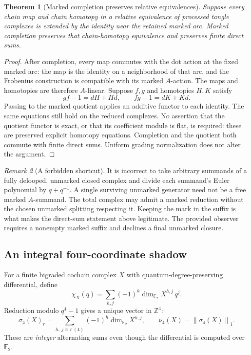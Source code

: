 \documentclass[11pt]{article}
\newtheorem{theorem}{Theorem}[section]
\theoremstyle{definition}
\theoremstyle{remark}
\newtheorem{remark}[theorem]{Remark}
\newcommand{\F}{{\mathbb F_2}}
\newcommand{\Z}{\mathbb Z}
\newcommand{\sig}{\sigma_4}
\newcommand{\nuFour}{\nu_4}
\newcommand{\norm}[1]{\left\lVert#1\right\rVert_1}
\begin{document}
\begin{theorem}[Marked completion preserves relative equivalences]
\label{thm:mark}
Suppose every chain map and chain homotopy in a relative equivalence of
processed tangle complexes is extended by the identity near the retained
marked arc. Marked completion preserves that chain-homotopy equivalence and
preserves finite direct sums.
\end{theorem}
\begin{proof}
After completion, every map commutes with the dot action at the fixed marked
arc: the map is the identity on a neighborhood of that arc, and the
Frobenius construction is compatible with its marked $A$-action. The maps
and homotopies are therefore $A$-linear. Suppose $f,g$ and homotopies $H,K$
satisfy
\[
 gf-1=dH+Hd,\qquad fg-1=dK+Kd.
\]
Passing to the marked quotient applies an additive functor to each identity.
The same equations still hold on the reduced complexes. No assertion that
the quotient functor is exact, or that its coefficient module is flat, is
required: these are preserved explicit homotopy equations. Completion and
the quotient both commute with finite direct sums. Uniform grading
normalization does not alter the argument.
\end{proof}

\begin{remark}[A forbidden shortcut]\label{rem:divide}
It is incorrect to take arbitrary summands of a fully delooped, unmarked
closed complex and divide each summand's Euler polynomial by
$q+q^{-1}$. A single surviving unmarked generator need not be a free marked
$A$-summand. The total complex may admit a marked reduction without the
chosen unmarked splitting respecting it. Keeping the mark in the suffix is
what makes the direct-sum statement above legitimate. The provided observer
requires a nonempty marked suffix and declines a final unmarked closure.
\end{remark}

\subsection{An integral four-coordinate shadow}
For a finite bigraded cochain complex $X$ with quantum-degree-preserving
differential, define
\[
 \chi_X(q)=\sum_{h,j}(-1)^h\dim_\F X^{h,j}\,q^j.
\]
Reduction modulo $q^4-1$ gives a unique vector in $\Z^4$:
\begin{equation}\label{eq:sigma}
 \sig(X)_r=\sum_{h,\ j\equiv r\ (4)}(-1)^h\dim_\F X^{h,j},
 \qquad \nuFour(X)=\norm{\sig(X)}.
\end{equation}
These are \emph{integer} alternating sums even though the differential is
computed over $\F$.
\end{document}
